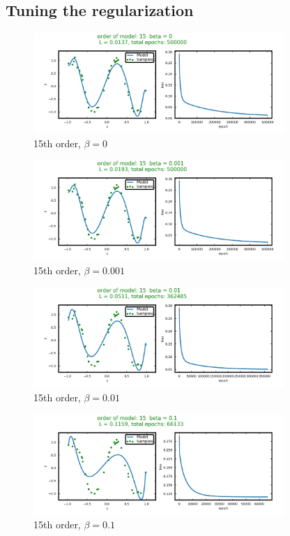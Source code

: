 \subsection{Tuning the regularization}


\begin{figure}[H]
\centering
  \includegraphics[width=0.85\textwidth]{fig/prob2/degree_15_beta_0_loss.png}
\centering 
\caption{\protect 15th order, $\beta = 0$}
\label{fig:15th}
\end{figure}
\begin{figure}[H]
\centering
  \includegraphics[width=0.85\textwidth]{fig/prob2/degree_15_beta_0_001_loss.png}
\centering 
\caption{\protect 15th order, $\beta = 0.001$}
\label{fig:15th}
\end{figure}
\begin{figure}[H]
\centering
  \includegraphics[width=0.85\textwidth]{fig/prob2/degree_15_beta_0_01_loss.png}
\centering 
\caption{\protect 15th order, $\beta = 0.01$}
\label{fig:15th}
\end{figure}
\begin{figure}[H]
\centering
  \includegraphics[width=0.85\textwidth]{fig/prob2/degree_15_beta_0_1_loss.png}
\centering 
\caption{\protect 15th order, $\beta = 0.1$}
\label{fig:15th}
\end{figure}
